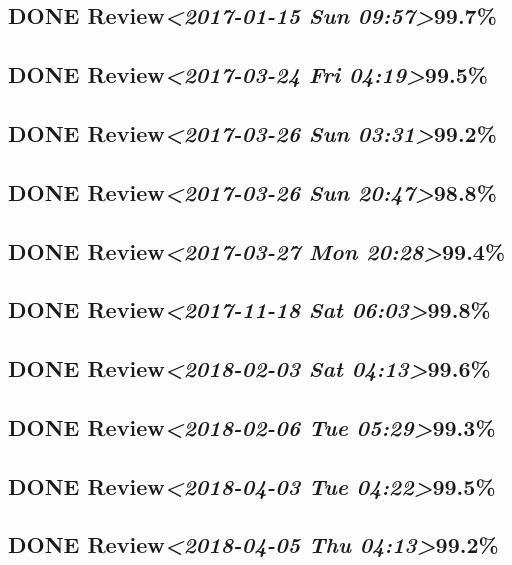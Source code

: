 \documentclass[11pt]{ctexart}
\begin{document}
\subsection{{\bfseries\sffamily DONE} Review\textit{<2017-01-15 Sun 09:57>}99.7\%}
\label{sec:org14a923f}
\subsection{{\bfseries\sffamily DONE} Review\textit{<2017-03-24 Fri 04:19>}99.5\%}
\label{sec:orgb977416}
\subsection{{\bfseries\sffamily DONE} Review\textit{<2017-03-26 Sun 03:31>}99.2\%}
\label{sec:orge240661}
\subsection{{\bfseries\sffamily DONE} Review\textit{<2017-03-26 Sun 20:47>}98.8\%}
\label{sec:org61ac8db}
\subsection{{\bfseries\sffamily DONE} Review\textit{<2017-03-27 Mon 20:28>}99.4\%}
\label{sec:orgef4de74}

\subsection{{\bfseries\sffamily DONE} Review\textit{<2017-11-18 Sat 06:03>}99.8\%}
\label{sec:org66b6328}
\subsection{{\bfseries\sffamily DONE} Review\textit{<2018-02-03 Sat 04:13>}99.6\%}
\label{sec:org7250a72}
\subsection{{\bfseries\sffamily DONE} Review\textit{<2018-02-06 Tue 05:29>}99.3\%}
\label{sec:org7c9a88a}
\subsection{{\bfseries\sffamily DONE} Review\textit{<2018-04-03 Tue 04:22>}99.5\%}
\label{sec:org34a765b}
\subsection{{\bfseries\sffamily DONE} Review\textit{<2018-04-05 Thu 04:13>}99.2\%}
\label{sec:org4088cd7}
\end{document}
